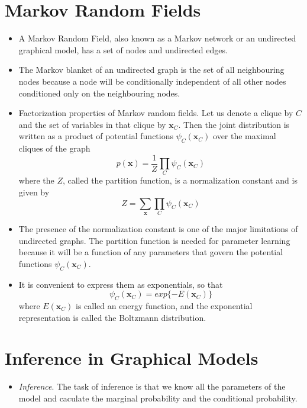 \documentclass[12pt, a4paper]{article}
\begin{document}
    \section{Markov Random Fields}
    \begin{itemize}
        \item A Markov Random Field, also known as a Markov network or an undirected graphical model, 
        has a set of nodes and undirected edges.
        \item The Markov blanket of an undirected graph is the set of all neighbouring nodes because 
        a node will be conditionally independent of all other nodes conditioned only on the 
        neighbouring nodes.
        \item Factorization properties of Markov random fields. Let us denote a clique by $C$ and the 
        set of variables in that clique by $\bm{x}_C$. Then the joint distribution is written as a 
        product of potential functions $\psi_C(\bm{x}_C)$ over the maximal cliques of the graph
        \begin{equation*}
            p(\bm{x})=\frac{1}{Z}\prod_C\psi_C(\bm{x}_C)
        \end{equation*}
        where the $Z$, called the partition function, is a normalization constant and is given by 
        \begin{equation*}
            Z=\sum_{\bm{x}}\prod_C\psi_C(\bm{x}_C)
        \end{equation*}
        \item The presence of the normalization constant is one of the major limitations of undirected 
        graphs. The partition function is needed for parameter learning because it will be a function of 
        any parameters that govern the potential functions $\psi_C(\bm{x}_C)$.
        \item It is convenient to express them as exponentials, so that
        \begin{equation*}
            \psi_C(\bm{x}_C)=exp\{-E(\bm{x}_C)\}
        \end{equation*}
        where $E(\bm{x}_C)$ is called an energy function, and the exponential representation is called the 
        Boltzmann distribution. 
    \end{itemize}
    \section{Inference in Graphical Models}
    \begin{itemize}
        \item \textit{Inference}. The task of inference is that we know all the parameters of the model and
        caculate the marginal probability and the conditional probability. 
    \end{itemize}
\end{document}
